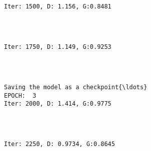 \documentclass[11pt]{article}
\begin{document}
    \begin{center}
    \end{center}
    { \hspace*{\fill} \\}
    
    \begin{Verbatim}[commandchars=\\\{\}]

Iter: 1500, D: 1.156, G:0.8481
    \end{Verbatim}

    \begin{center}
    \end{center}
    { \hspace*{\fill} \\}
    
    \begin{Verbatim}[commandchars=\\\{\}]

Iter: 1750, D: 1.149, G:0.9253
    \end{Verbatim}

    \begin{center}
    \end{center}
    { \hspace*{\fill} \\}
    
    \begin{Verbatim}[commandchars=\\\{\}]

Saving the model as a checkpoint{\ldots}
EPOCH:  3
Iter: 2000, D: 1.414, G:0.9775
    \end{Verbatim}

    \begin{center}
    \end{center}
    { \hspace*{\fill} \\}
    
    \begin{Verbatim}[commandchars=\\\{\}]

Iter: 2250, D: 0.9734, G:0.8645
    \end{Verbatim}
\end{document}
